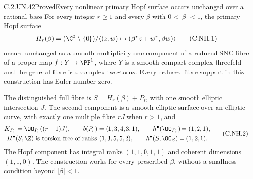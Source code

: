 \begin{statement}{C.2.UN.42}{Proved}{Every nonlinear primary Hopf surface occurs unchanged over a rational base}
For every integer $r\ge1$ and every $\beta$ with $0<|\beta|<1$,
the primary Hopf surface
\[
 H_r(\beta)=(\C^2\setminus\{0\})/
   \langle(z,w)\mapsto(\beta^r z+w^r,\beta w)\rangle
                                                        \tag{C.NH.1}
\]
occurs unchanged as a smooth multiplicity-one component of a
reduced SNC fibre of a proper map $f:Y\to\PP^1$, where $Y$ is
a smooth compact complex threefold and the general fibre is a
complex two-torus. Every reduced fibre support in this
construction has Euler number zero.

The distinguished full fibre is $S=H_r(\beta)+P_r$, with one
smooth elliptic intersection $J$. The second component is a
smooth elliptic surface over an elliptic curve, with exactly
one multiple fibre $rJ$ when $r>1$, and
\[
 \begin{gathered}
 K_{P_r}=\OO_{P_r}((r-1)J),\qquad
 b(P_r)=(1,3,4,3,1),\qquad h^\bullet(\OO_{P_r})=(1,2,1),\\
 H^\bullet(S,\Z)\text{ is torsion-free of ranks }(1,3,5,5,2),
 \qquad h^\bullet(S,\OO_S)=(1,2,1).
 \end{gathered}                                         \tag{C.NH.2}
\]
The Hopf component has integral ranks $(1,1,0,1,1)$ and
coherent dimensions $(1,1,0)$. The construction works for
every prescribed $\beta$, without a smallness condition
beyond $|\beta|<1$.
\end{statement}

